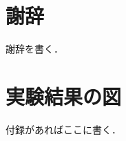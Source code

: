 \documentclass[a4paper, oneside, openany, dvipdfmx]{suribt}%
\begin{document}
\backmatter%
\chapter{謝辞}%
謝辞を書く．


\appendix%
\chapter{実験結果の図}
付録があればここに書く．
\end{document}
